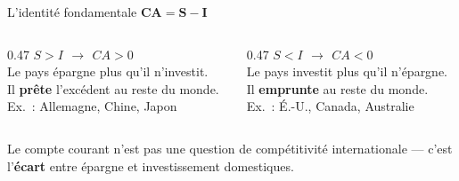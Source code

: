 \documentclass[aspectratio=169]{beamer}
\begin{document}
\begin{frame}[t]{L'identité fondamentale}\examtag
   \vspace{0.3cm}
   \centering
   {\LARGE $\mathbf{CA = S - I}$}
   \vspace{0.5cm}

   \begin{columns}[T]
      \begin{column}{0.47\textwidth}
         \centering
         \textcolor{HECgreen}{\large\bfseries $S > I$ $\to$ $CA > 0$}\\[8pt]
         \small
         Le pays épargne plus qu'il n'investit.\\[4pt]
         Il \textbf{prête} l'excédent au reste du monde.\\[4pt]
         \textcolor{HECgray}{Ex.\ : Allemagne, Chine, Japon}
      \end{column}
      \begin{column}{0.47\textwidth}
         \centering
         \textcolor{HECcoral}{\large\bfseries $S < I$ $\to$ $CA < 0$}\\[8pt]
         \small
         Le pays investit plus qu'il n'épargne.\\[4pt]
         Il \textbf{emprunte} au reste du monde.\\[4pt]
         \textcolor{HECgray}{Ex.\ : É.-U., Canada, Australie}
      \end{column}
   \end{columns}
   \vspace{0.3cm}
   \begin{keyinsight}
      Le compte courant n'est pas une question de compétitivité internationale --- c'est l'\textbf{écart} entre épargne et investissement domestiques.
   \end{keyinsight}
\end{frame}
\end{document}

